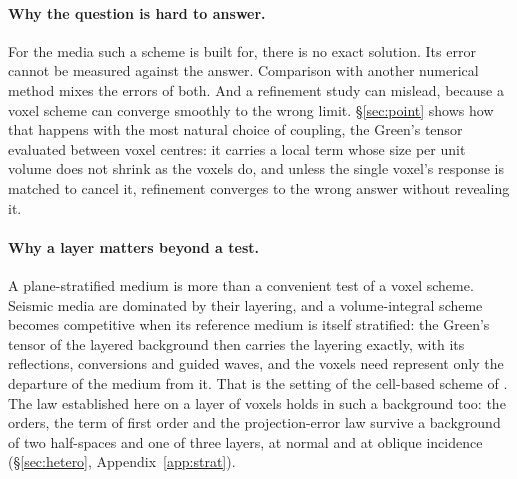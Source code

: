 \documentclass[11pt,a4paper]{article}
\begin{document}
\paragraph{Why the question is hard to answer.} For the media such a scheme is built for, there is no
exact solution. Its error cannot be measured against the answer. Comparison with another numerical
method mixes the errors of both. And a refinement study can mislead, because a voxel scheme can
converge smoothly to the wrong limit. \S\ref{sec:point} shows how that happens with the most natural
choice of coupling, the Green's tensor evaluated between voxel centres: it carries a local term whose
size per unit volume does not shrink as the voxels do, and unless the single voxel's response is
matched to cancel it, refinement converges to the wrong answer without revealing it.


\paragraph{Why a layer matters beyond a test.} A plane-stratified medium is more than a convenient test
of a voxel scheme. Seismic media are dominated by their layering, and a volume-integral scheme becomes
competitive when its reference medium is itself stratified: the Green's tensor of the layered background
then carries the layering exactly, with its reflections, conversions and guided waves, and the voxels
need represent only the departure of the medium from it. That is the setting of the cell-based scheme of
\citet{Nestor1996}. The law established here on a layer of voxels holds in such a background too: the
orders, the term of first order and the projection-error law survive a background of two half-spaces and
one of three layers, at normal and at oblique incidence (\S\ref{sec:hetero},
Appendix~\ref{app:strat}).
\end{document}
